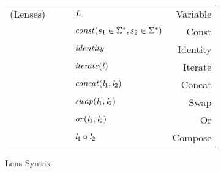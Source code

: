 \begin{figure}
\centering
\begin{tabular}{l@{\ }l@{\ }c@{\ }l@{\ }r}
(Lenses)& \Lens{} & \GEq{} & $\mathit{L}$ & Variable\\
& & & \GBar{} $\mathit{const}(s_1 \in \Sigma^*,s_2 \in \Sigma^*)$ & Const \\
& & & \GBar{} $\mathit{identity}$ & Identity\\
& & & \GBar{} $\mathit{iterate(\mathit{l})}$ & Iterate \\
& & & \GBar{} $\mathit{concat}(\mathit{l}_1,\mathit{l}_2)$ & Concat \\
& & & \GBar{} $\mathit{swap}(\mathit{l}_1,\mathit{l}_2)$ & Swap\\
& & & \GBar{} $\mathit{or}(\mathit{l}_1,\mathit{l}_2)$ & Or\\
& & & \GBar{} $\mathit{l}_1 \circ \mathit{l}_2$ & Compose\\
\end{tabular}
\caption{Lens Syntax}
\label{fig:lens-syntax}
\end{figure}
